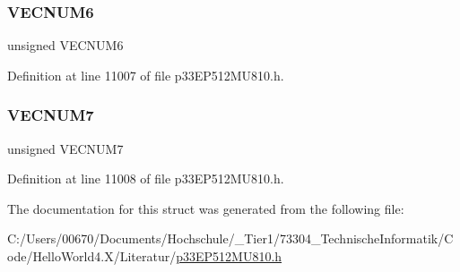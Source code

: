 \mbox{\label{structtag_i_n_t_t_r_e_g_b_i_t_s_aa954314cbf531bef941c8efa79b4e212}} 
\subsubsection{\texorpdfstring{V\+E\+C\+N\+U\+M6}{VECNUM6}}
{\footnotesize\ttfamily unsigned V\+E\+C\+N\+U\+M6}



Definition at line 11007 of file p33\+E\+P512\+M\+U810.\+h.

\mbox{\label{structtag_i_n_t_t_r_e_g_b_i_t_s_afe49bbae378e76499bd185dde4d61713}} 
\subsubsection{\texorpdfstring{V\+E\+C\+N\+U\+M7}{VECNUM7}}
{\footnotesize\ttfamily unsigned V\+E\+C\+N\+U\+M7}



Definition at line 11008 of file p33\+E\+P512\+M\+U810.\+h.



The documentation for this struct was generated from the following file\+:\begin{DoxyCompactItemize}
\item 
C\+:/\+Users/00670/\+Documents/\+Hochschule/\+\_\+\+Tier1/73304\+\_\+\+Technische\+Informatik/\+Code/\+Hello\+World4.\+X/\+Literatur/\hyperlink{p33_e_p512_m_u810_8h}{p33\+E\+P512\+M\+U810.\+h}\end{DoxyCompactItemize}
